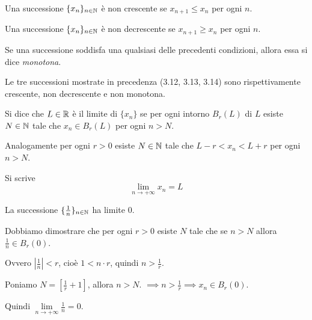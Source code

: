 \begin{definition}
Una successione $\{x_n\}_{n \in \mathbb N}$ è non crescente se $x_{n+1} \le x_n$ per ogni $n$.
\end{definition}

\begin{definition}
Una successione $\{x_n\}_{n \in \mathbb N}$ è non decrescente se $x_{n+1} \ge x_n$ per ogni $n$.
\end{definition}

Se una successione soddisfa una qualsiasi delle precedenti condizioni, allora essa si dice \emph{monotona}.

\begin{example}
Le tre successioni mostrate in precedenza (3.12, 3.13, 3.14) sono rispettivamente crescente, non decrescente e non monotona.
\end{example}

\begin{definition}
Si dice che $L \in \mathbb R$ è il limite di $\{ x_n \}$ se per ogni intorno $B_r(L)$ di $L$ esiste $N \in \mathbb N$ tale che $x_n \in B_r(L)$ per ogni $n > N$.

Analogamente per ogni $r > 0$ esiste $N \in \mathbb N$ tale che $L-r < x_n < L+r$ per ogni $n > N$.

Si scrive
\begin{equation*}
\lim_{n \to +\infty}{x_n} = L
\end{equation*}
\end{definition}

\begin{example}
La successione $\{\frac{1}{n}\}_{n \in \mathbb N}$ ha limite 0.

Dobbiamo dimostrare che per ogni $r > 0$ esiste $N$ tale che se $n > N$ allora $\frac{1}{n} \in B_r(0)$.

Ovvero $|\frac{1}{n}| < r$, cioè $1 < n \cdot r$, quindi $n > \frac{1}{r}$.

Poniamo $N = [\frac{1}{r} + 1]$, allora $n > N$. $\implies n > \frac{1}{r} \implies x_n \in B_r(0)$. 

Quindi $\lim\limits_{n \to +\infty} \frac{1}{n} = 0$.
\end{example}